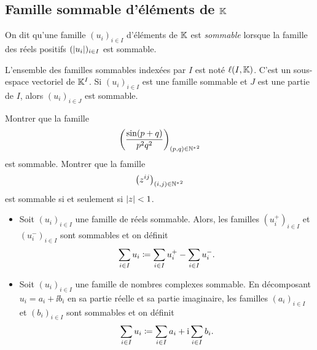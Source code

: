 \documentclass{magnolia}
\begin{document}


\subsection{Famille sommable d'éléments de $\mathbb{K}$}

\begin{definition}
On dit qu'une famille $(u_i)_{i\in I}$ d'éléments de $\mathbb{K}$ est \emph{sommable} lorsque
la famille des réels positifs $(\left|u_i\right|)_{i\in I}$ est sommable.
\end{definition}

\begin{remarques}
\remarque L'ensemble des familles sommables indexées par $I$ est noté $\ell(I,\mathbb{K})$. C'est un sous-espace vectoriel de $\mathbb{K}^I$.
\remarque Si $(u_i)_{i\in I}$ est une famille sommable et $J$ est une partie de $I$, alors $(u_i)_{i\in J}$ est sommable.
\end{remarques}

\begin{exos}
\exo Montrer que la famille
  \[\left(\frac{\sin(p+q)}{p^2 q^2}\right)_{(p,q)\in{\mathbb{N}^*}^2}\]
  est sommable.
\exo Montrer que la famille
  \[\left(z^{ij}\right)_{(i,j)\in{\mathbb{N}^*}^2}\]
  est sommable si et seulement si $\left|z\right|<1$.
\end{exos}

\begin{definition}
\begin{itemize}
\item Soit $(u_i)_{i\in I}$ une famille de réels sommable. Alors, les familles $(u_i^{+})_{i\in I}$ et
  $(u_i^{-})_{i\in I}$ sont sommables et on définit
  \[\sum_{i\in I} u_i\coloneqq \sum_{i\in I} u_i^{+} - \sum_{i\in I} u_i^{-}.\]
\item Soit $(u_i)_{i\in I}$ une famille de nombres complexes sommable. En décomposant $u_i = a_i + \ii b_i$ en sa
  partie réelle et sa partie imaginaire, les familles $(a_i)_{i\in I}$ et $(b_i)_{i\in I}$ sont sommables et on définit
  \[\sum_{i\in I} u_i\coloneqq \sum_{i\in I} a_i + {\rm i} \sum_{i\in I} b_i.\]
\end{itemize}
\end{definition}
\end{document}
